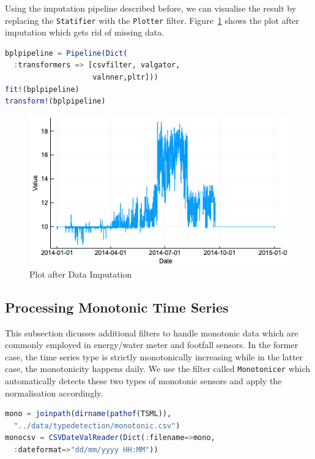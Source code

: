 \documentclass{juliacon}
\begin{document}
Using the imputation pipeline described before, we can visualise the result by replacing the \texttt{Statifier} with the \texttt{Plotter} filter. Figure~\ref{fig:amplot} shows the plot after imputation which gets rid of missing data.

\begin{lstlisting}[language = Julia]
bplpipeline = Pipeline(Dict(
  :transformers => [csvfilter, valgator, 
                    valnner,pltr]))
fit!(bplpipeline)
transform!(bplpipeline)
\end{lstlisting}


\begin{figure}[htbp]
   \centering
   \includegraphics[width=\columnwidth]{amplot.png} %
   \caption{Plot after Data Imputation}
   \label{fig:amplot}
\end{figure}

\subsection{Processing Monotonic Time Series}
This subsection dicusses additional filters to handle monotonic data which are commonly employed in energy/water meter and footfall sensors. In the former case, the time series type is strictly monotonically increasing while in the latter case, the monotonicity happens daily. We use the filter called \texttt{Monotonicer} which automatically detects these two types of monotonic sensors and apply the normalisation accordingly. 

\begin{lstlisting}[language = Julia]
mono = joinpath(dirname(pathof(TSML)),
  "../data/typedetection/monotonic.csv")
monocsv = CSVDateValReader(Dict(:filename=>mono,
  :dateformat=>"dd/mm/yyyy HH:MM"))
\end{lstlisting}
\end{document}
